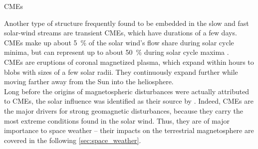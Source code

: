 
CMEs

Another type of structure frequently found to be embedded in the slow and fast solar-wind streams are transient CMEs, which have durations of a few days. CMEs make up about \SI{5}{\percent} of the solar wind's flow share during solar cycle minima, but can represent up to about \SI{50}{\percent} during solar cycle maxima \citep{Richardson2012}.\\

CMEs are eruptions of coronal magnetized plasma, which expand within hours to blobs with sizes of a few solar radii. They continuously expand further while moving farther away from the Sun into the heliosphere.\\

Long before the origins of magnetospheric disturbances were actually attributed to CMEs, the solar influence was identified as their source by \citet{Carrington1859}. Indeed, CMEs are the major drivers for strong geomagnetic disturbances, because they carry the most extreme conditions found in the solar wind. Thus, they are of major importance to space weather -- their impacts on the terrestrial magnetosphere are covered in the following \autoref{sec:space_weather}.\\

